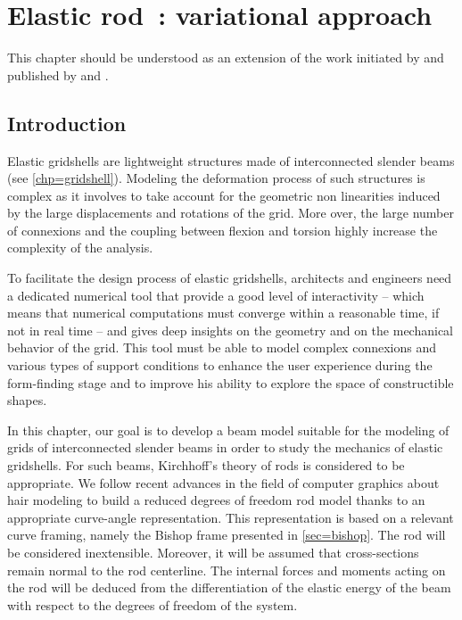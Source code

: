 
\newrefsegment
\chapter{Elastic rod~: variational approach}\label{chp=energy}

This chapter should be understood as an extension of the work initiated by  and published by  and .

\section{Introduction}

Elastic gridshells are lightweight structures made of interconnected slender beams (see \cref{chp=gridshell}). Modeling the deformation process of such structures is complex as it involves to take account for the geometric non linearities induced by the large displacements and rotations of the grid. More over, the large number of connexions and the coupling between flexion and torsion highly increase the complexity of the analysis.

To facilitate the design process of elastic gridshells, architects and engineers need a dedicated numerical tool that provide a good level of interactivity -- which means that numerical computations must converge within a reasonable time, if not in real time -- and gives deep insights on the geometry and on the mechanical behavior of the grid. This tool must be able to model complex connexions and various types of support conditions to enhance the user experience during the form-finding stage and to improve his ability to explore the space of constructible shapes.

In this chapter, our goal is to develop a beam model suitable for the modeling of grids of interconnected slender beams in order to study the mechanics of elastic gridshells. For such beams, Kirchhoff's theory of rods is considered to be appropriate. We follow recent advances in the field of computer graphics about hair modeling \cite{Bergou2008} to build a reduced degrees of freedom rod model thanks to an appropriate curve-angle representation. This representation is based on a relevant curve framing, namely the Bishop frame presented in \cref{sec=bishop}. The rod will be considered inextensible. Moreover, it will be assumed that cross-sections remain normal to the rod centerline. The internal forces and moments acting on the rod will be deduced from the differentiation of the elastic energy of the beam with respect to the degrees of freedom of the system.

